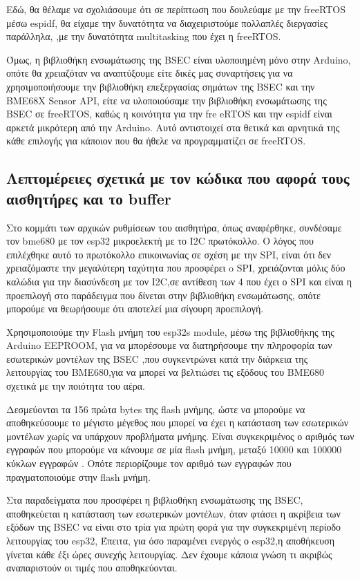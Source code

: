 Εδώ, θα θέλαμε να σχολιάσουμε ότι σε περίπτωση που δουλεύαμε με την freeRTOS μέσω esp\-idf, θα είχαμε την δυνατότητα να διαχειριστούμε πολλαπλές διεργασίες παράλληλα, 
,με την δυνατότητα multitasking που έχει η freeRTOS.

Όμως, η βιβλιοθήκη ενσωμάτωσης της BSEC είναι υλοποιημένη μόνο στην Arduino, οπότε θα χρειαζόταν να αναπτύξουμε είτε δικές μας συναρτήσεις 
για να χρησιμοποιήσουμε την βιβλιοθήκη επεξεργασίας σημάτων της BSEC και την BME68X Sensor API, είτε να υλοποιούσαμε την βιβλιοθήκη ενσωμάτωσης της BSEC σε freeRTOS,
καθώς η κοινότητα για την fre eRTOS και την esp\-idf είναι αρκετά μικρότερη από την Arduino.
Αυτό αντιστοιχεί στα θετικά και αρνητικά της κάθε επιλογής για κάποιον που θα ήθελε να προγραμματίζει σε freeRTOS.

\subsection{Λεπτομέρειες σχετικά με τον κώδικα που αφορά τους αισθητήρες και το buffer}

Στο κομμάτι των αρχικών ρυθμίσεων του αισθητήρα, όπως αναφέρθηκε, συνδέσαμε τον bme680 με τον esp32 μικροελεκτή με το I2C πρωτόκολλο.
Ο λόγος που επιλέχθηκε αυτό το πρωτόκολλο επικοινωνίας σε σχέση με την SPI,
είναι ότι δεν χρειαζόμαστε την μεγαλύτερη ταχύτητα που προσφέρει o SPI,
χρειάζονται μόλις δύο καλώδια για την διασύνδεση με τον I2C,σε αντίθεση των 4 που έχει ο SPI και είναι η προεπιλογή στο παράδειγμα που δίνεται
στην βιβλιοθήκη ενσωμάτωσης, οπότε μπορούμε να θεωρήσουμε ότι αποτελεί μια σίγουρη προεπιλογή.

Χρησιμοποιούμε την Flash μνήμη του esp32s module, μέσω της βιβλιοθήκης της Arduino EEPROOM, 
για να μπορέσουμε να διατηρήσουμε την πληροφορία των εσωτερικών μοντέλων της BSEC ,που συγκεντρώνει κατά
την διάρκεια της λειτουργίας του BME680,για να μπορεί να βελτιώσει τις εξόδους του BME680 σχετικά με την ποιότητα του αέρα.

Δεσμεύονται τα 156 πρώτα bytes της flash μνήμης, ώστε να μπορούμε να αποθηκεύσουμε το μέγιστο μέγεθος που 
μπορεί να έχει η κατάσταση των εσωτερικών μοντέλων χωρίς να υπάρχουν προβλήματα μνήμης.
Είναι συγκεκριμένος ο αριθμός των εγγραφών που μπορούμε να κάνουμε σε μία flash μνήμη, μεταξύ 10000 και 100000 κύκλων εγγραφών \cite{esp32EEPROM}.
Οπότε περιορίζουμε τον αριθμό των εγγραφών που πραγματοποιούμε στην flash μνήμη.

Στα παραδείγματα που προσφέρει η βιβλιοθήκη ενσωμάτωσης της BSEC,
αποθηκεύεται η κατάσταση των εσωτερικών μοντέλων, όταν φτάσει η ακρίβεια των εξόδων της BSEC να είναι στο τρία για πρώτη φορά για την συγκεκριμένη περίοδο λειτουργίας του esp32,
Έπειτα, για όσο παραμένει ενεργός ο esp32,η αποθήκευση γίνεται κάθε έξι ώρες συνεχής λειτουργίας.
Δεν έχουμε κάποια γνώση τι ακριβώς αναπαριστούν οι τιμές που αποθηκεύονται.

